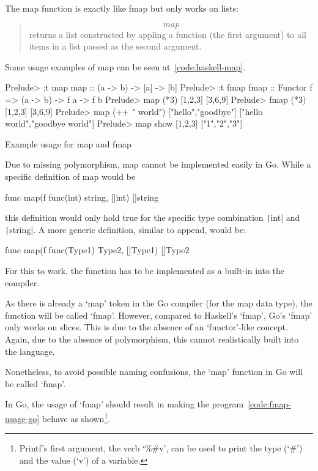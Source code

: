 The map function is exactly like fmap but only works on lists:

\begin{quote}
    \[map\] returns a list constructed by appling a function (the first argument) to all
    items in a list passed as the second argument\autocite{haskell-map}.
\end{quote}

Some usage examples of map can be seen at~\ref{code:haskell-map}.

\begin{listing}
    \begin{haskellcode}
Prelude> :t map
map :: (a -> b) -> [a] -> [b]
Prelude> :t fmap
fmap :: Functor f => (a -> b) -> f a -> f b
Prelude> map (*3) [1,2,3]
[3,6,9]
Prelude> fmap (*3) [1,2,3]
[3,6,9]
Prelude> map (++ " world") ["hello","goodbye"]
["hello world","goodbye world"]
Prelude> map show [1,2,3]
["1","2","3"]
    \end{haskellcode}
    \caption{Example usage for map and fmap}\label{code:haskell-map}
\end{listing}
Due to missing polymorphism, map cannot be implemented easily in Go. While
a specific definition of map would be
\begin{gocode}
func map(f func(int) string, []int) []string
\end{gocode}
this definition would only hold true for the specific type combination \texttt|int|
and \texttt|string|. A more generic definition, similar to append,
would be:
\begin{gocode}
func map(f func(Type1) Type2, []Type1) []Type2
\end{gocode}
For this to work, the function has to be implemented as a built-in into the compiler.

As there is already a `map' token in the Go compiler (for the map data type),
the function will be called `fmap'. However, compared to Haskell's `fmap',
Go's `fmap' only works on slices. This is due
to the absence of an `functor'-like concept. Again, due to the absence of polymorphism,
this cannot realistically built into the language.

Nonetheless, to avoid possible naming confusions, the `map' function in Go will
be called `fmap'.

In Go, the usage of `fmap' should result in making the program~\ref{code:fmap-usage-go}
behave as shown\footnote{Printf's first argument, the
verb `\%\#v', can be used to print the type (`\#') and the value (`v') of a
variable\autocite{fmt-godoc}.}.

